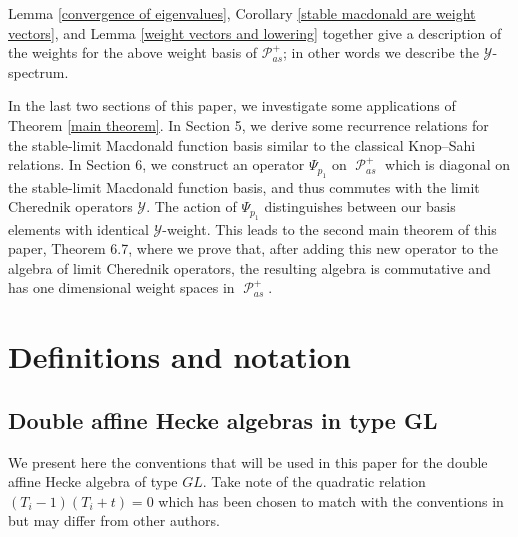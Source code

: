 \documentclass[11pt]{article}
\theoremstyle{definition}
\numberwithin{equation}{section}
\newcommand{\y}{{ \mathscr{Y} }}
\DeclareMathOperator{\sP}{\mathscr{P} }
\begin{document}
Lemma \ref{convergence of eigenvalues}, Corollary \ref{stable macdonald are weight vectors}, and Lemma \ref{weight vectors and lowering} together give a description of the weights for the above weight basis of  $\mathscr{P}_{as}^{+}$; in other words we describe the $\y$-spectrum. 

In the last two sections of this paper, we investigate some applications of Theorem \ref{main theorem}. In 
Section 5, we derive some recurrence relations for the stable-limit Macdonald function basis similar to the classical Knop--Sahi relations. In Section 6, we construct an operator $\Psi_{p_1}$ on $\sP_{as}^{+}$ which is diagonal on the stable-limit Macdonald function basis, and thus commutes with the limit Cherednik operators $\y$. The action of $\Psi_{p_1}$  distinguishes between our basis elements with identical $\y$-weight. This leads to the second main theorem of this paper, Theorem 6.7, where we prove that, after adding this new operator to the algebra of limit Cherednik operators, the resulting algebra is commutative and has one dimensional weight spaces in $\sP_{as}^{+}.$

\section{Definitions and notation}\label{defn and notations}

\subsection{Double affine Hecke algebras in type GL}

We present here the conventions that will be used in this paper for the double affine Hecke algebra of type $GL$. Take note of the quadratic relation $(T_{i}-1)(T_{i}+t) = 0$ which has been chosen to match with the conventions in \cite{Ion_2022} but may differ from other authors.
\end{document}
